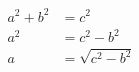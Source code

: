 \begin{equation}
   \begin{split}
   a^2 + b^2 &= c^2 \\
   a^2 &= c^2 - b^2\\
   a &= \sqrt{c^2 - b^2}\\
   \end{split}
\end{equation}